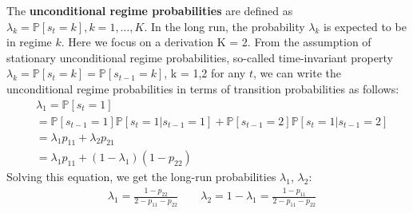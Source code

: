 \documentclass[12pt,a4paper]{article}
\begin{document}
The \textbf{unconditional regime probabilities} are defined as $\lambda_k = \mathbb{P} [s_t = k], k = 1, \ldots, K$. In the long run,
the probability $\lambda_k$ is expected to be in regime $k$. Here we focus on a derivation K = 2. From the assumption of stationary unconditional regime probabilities, so-called time-invariant property $\lambda_k = \mathbb{P} [s_t = k] = \mathbb{P} [s_{t-1} = k]$, k = 1,2 for any $t$, we can write the unconditional regime probabilities in terms of transition probabilities as follows:
\begin{align}
    & \lambda_1 = \mathbb{P} [s_t = 1] \nonumber \\
    &= \mathbb{P} [s_{t-1} = 1]\mathbb{P}[s_t = 1 \vert s_{t-1} = 1] + \mathbb{P}[s_{t-1} = 2]\mathbb{P}[s_t = 1 \vert s_{t-1} = 2]\nonumber \\ 
    &= \lambda_1 p_{11} + \lambda_2 p_{21} \nonumber \\
    &= \lambda_1 p_{11} + (1-\lambda_1)(1-p_{22})
\end{align}
Solving this equation, we get the long-run probabilities $\lambda_1$, $\lambda_2$:
\begin{align}
    & \lambda_1 = \frac{1-p_{22}}{2-p_{11}-p_{22}} \qquad \lambda_2 = 1 - \lambda_1 = \frac{1-p_{11}}{2-p_{11}-p_{22}}
\end{align}
\end{document}
